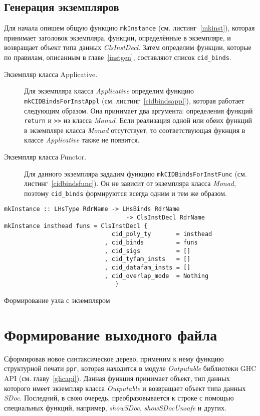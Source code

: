\subsection{Генерация экземпляров}
Для начала опишем общую функцию \lstinline{mkInstance} (см. листинг~\ref{mkinst}), которая принимает заголовок экземпляра, функции, определённые в экземпляре, и возвращает объект типа данных \textit{ClsInstDecl}.
Затем определим функции, которые по правилам, описанным в главе~\ref{instgen}, составляют список \lstinline{cid_binds}.
\begin{description}
\item[Экземпляр класса Applicative.] Для экземпляра класса \textit{Applicative} определим функцию \lstinline{mkCIDBindsForInstAppl} (см. листинг~\ref{cidbindsappl}), которая работает следующим образом. Она принимает два аргумента: определения функций \lstinline{return} и \lstinline{>>} из класса \textit{Monad}. Если реализация одной или обеих функций в экземпляре класса \textit{Monad} отсутствует, то соответствующая фукнция в классе \textit{Applicative} также не появится.
\item[Экземпляр класса Functor.] Для данного экземпляра зададим функцию \lstinline{mkCIDBindsForInstFunc} (см. листинг~\ref{cidbindsfunc}). Он не зависит от экземпляра класса \textit{Monad}, поэтому \lstinline{cid_binds} формируются всегда одним и тем же образом.
\end{description}

\begin{ListingEnv}[h]
\begin{lstlisting}
mkInstance :: LHsType RdrName -> LHsBinds RdrName
                                  -> ClsInstDecl RdrName
mkInstance insthead funs = ClsInstDecl { 
                              cid_poly_ty       = insthead
                            , cid_binds         = funs
                            , cid_sigs          = []
                            , cid_tyfam_insts   = []
                            , cid_datafam_insts = []
                            , cid_overlap_mode  = Nothing
                               }
\end{lstlisting}
\caption{Формирование узла с экземпляром}\label{mkinst}
\end{ListingEnv}

\section{Формирование выходного файла}
Сформировав новое синтаксическое дерево, применим к нему функцию структурной печати \lstinline{ppr}, которая находится в модуле \textit{Outputable} библиотеки GHC API (см. главу~\ref{ghcapi}). Данная функция принимает объект, тип данных которого имеет экземпляр класса \textit{Outputable} и возвращает объект типа данных \textit{SDoc}. Последний, в свою очередь, преобразовывается к строке с помощью специальных функций, например, \textit{showSDoc}, \textit{showSDocUnsafe} и других.

